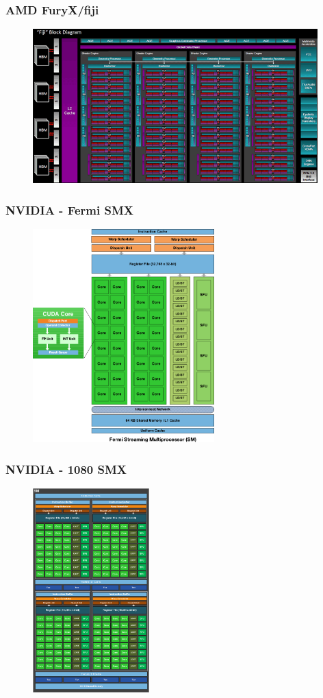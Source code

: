 \begin{frame}
\frametitle{AMD FuryX/fiji}
	\begin{figure}[h]
	\includegraphics[width=11cm,keepaspectratio]{pics/gpu/furyx}
	\end{figure}
\end{frame}

\begin{frame}
\frametitle{NVIDIA - Fermi SMX}
	\begin{figure}[h]
	\includegraphics[width=7cm,keepaspectratio]{pics/gpu/fermi}
	\end{figure}
\end{frame}

\begin{frame}
\frametitle{NVIDIA - 1080 SMX}
	\begin{figure}[h]
	\includegraphics[width=4.5cm,keepaspectratio]{pics/gpu/1080SMX}
	\end{figure}
\end{frame}

